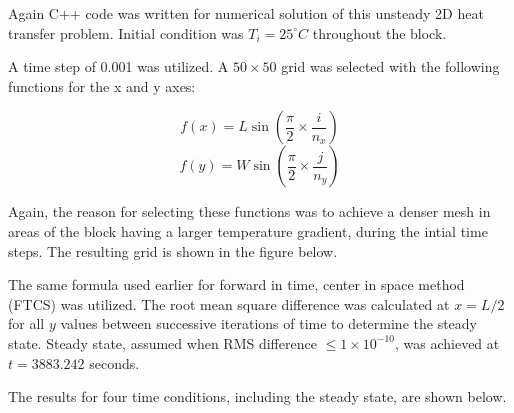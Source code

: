 \documentclass[12pt,a4paper,fleqn]{article}
\begin{document}
Again C++ code was written for numerical solution of this unsteady 2D heat transfer
problem. Initial condition was $T_i=25^{\circ}C$ throughout the block.

A time step of 0.001 was utilized. A $50\times50$ grid was selected with the
following functions for the x and y axes:

\begin{equation}
f(x)=L\sin\left(\frac{\pi}{2}\times\frac{i}{n_x}\right)
\end{equation}
\begin{equation}
f(y)=W\sin\left(\frac{\pi}{2}\times\frac{j}{n_y}\right)
\end{equation}

Again, the reason for selecting these functions was to achieve a denser
mesh in areas of the block having a larger temperature gradient, during the
intial time steps.
The resulting grid is shown in the figure below.


\newpage

The same formula used earlier for forward in time, center in space method (FTCS)
was utilized. The root mean square difference was calculated at $x = L/2$ for
all $y$ values between successive iterations of time to determine the steady
state.
Steady state, assumed when RMS difference $\leq1\times10^{-10}$, was achieved at
$t=3883.242$ seconds.

The results for four time conditions, including the steady state, are shown
below.
\end{document}
